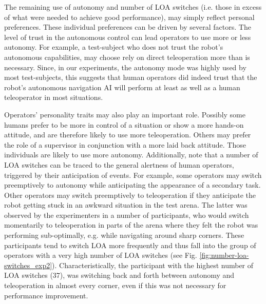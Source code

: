\documentclass[a4paper,12pt,oneside,openright]{bhamthesis}
\begin{document}
The remaining use of autonomy and number of LOA switches (i.e. those in excess of what were needed to achieve good performance), may simply reflect personal preferences. These individual preferences can be driven by several factors. The level of trust in the autonomous control can lead operators to use more or less autonomy. For example, a test-subject who does not trust the robot's autonomous capabilities, may choose rely on direct teleoperation more than is necessary. Since, in our experiments, the autonomy mode was highly used by most test-subjects, this suggests that human operators did indeed trust that the robot's autonomous navigation AI will perform at least as well as a human teleoperator in most situations.

Operators' personality traits may also play an important role. Possibly some humans prefer to be more in control of a situation or show a more hands-on attitude, and are therefore likely to use more teleoperation. Others may prefer the role of a supervisor in conjunction with a more laid back attitude. Those individuals are likely to use more autonomy. Additionally, note that a number of LOA switches can be traced to the general alertness of human operators, triggered by their anticipation of events. For example, some operators may switch preemptively to autonomy while anticipating the appearance of a secondary task. Other operators may switch preemptively to teleoperation if they anticipate the robot getting stuck in an awkward situation in the test arena. The latter was observed by the experimenters in a number of participants, who would switch momentarily to teleoperation in parts of the arena where they felt the robot was performing sub-optimally, e.g. while navigating around sharp corners. These participants tend to switch LOA more frequently and thus fall into the group of operators with a very high number of LOA switches (see Fig. \ref{fig:number-loa-switches_exp2}). Characteristically, the participant with the highest number of LOA switches (37), was switching back and forth between autonomy and teleoperation in almost every corner, even if this was not necessary for performance improvement.
\end{document}
